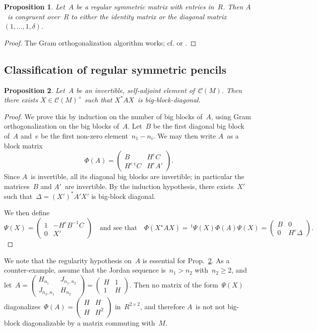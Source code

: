 \documentclass{article}%
\newtheorem{prop}{Proposition}
\let\ro\mathscr
\def\transpose{\,{}^{\mathrm{t}\!}}
\def\mat#1{\begin{pmatrix}#1\end{pmatrix}}
\begin{document}
\begin{prop}\label{prop:local-diag}
Let~$A$ be a regular symmetric matrix with entries in~$R$. Then $A$~is
congruent over~$R$ to either the identity matrix or the diagonal
matrix~$(1, …, 1, δ)$.
\end{prop}

\begin{proof}
The Gram orthogonalization algorithm works; cf.
\cite[I(3.4)]{milnorhusemoller} or \cite[92:1]{omeara}.
\end{proof}

\subsection{Classification of regular symmetric pencils}%


\begin{prop}\label{prop:bb-diag}
Let~$A$ be an invertible, self-adjoint element of~$\ro C(M)$. Then there
exists $X ∈ \ro C(M)^{×}$ such that $X^{*} A X$~is big-block-diagonal.
\end{prop}


\begin{proof}
We prove this by induction on the number of big blocks of~$A$, using Gram
orthogonalization on the big blocks of~$A$. Let~$B$ be the first diagonal
big block of~$A$ and~$e$ be the first non-zero element~$n_1 - n_i$. We
may then write $A$~as a block matrix
\begin{equation}
Φ(A) = \mat{B & H^{e} C\\ H^e\transpose{C} & H^e A'}.
\end{equation}
Since $A$~is invertible, all its diagonal big blocks are invertible; in
particular the matrices~$B$ and $A'$~are invertible. By the induction
hypothesis, there exists~$X'$ such that~$Δ = (X')^{*} A' X'$ is
big-block diagonal.

We then define
\begin{equation}
Ψ(X) = \mat{1 & -H^e B^{-1} C\\0 & X'}\quad\text{and see that}\quad
Φ(X^{⋆} A X) = \transpose{Ψ(X)} Φ(A) Ψ(X) = \mat{B & 0\\0 & H^e Δ}.
\end{equation}
\end{proof}

We note that the regularity hypothesis on~$A$ is essential for
Prop.~\ref{prop:bb-diag}. As a counter-example, assume that the Jordan
sequence is~$n_1 > n_2$ with~$n_2 ≥ 2$, and let~$A = \mat{H_{n_1} &
J_{n_1,n_2} \\ J_{n_2,n_1} & H_{n_2}} = \mat{H&1\\1&H}$.
Then no matrix of the form~$Ψ(X)$ diagonalizes~$Φ(A) = \mat{H&H\\H&H^2}$
in~$R^{2×2}$, and therefore $A$~is not not big-block diagonalizable by a
matrix commuting with~$M$.
\end{document}
